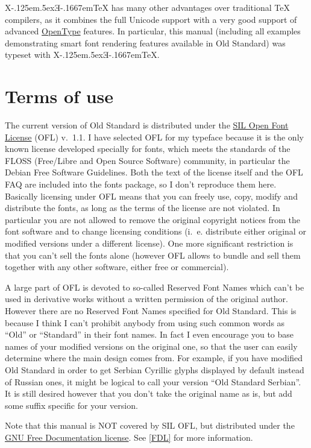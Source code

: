 \documentclass[12pt,a4paper,openany]{book}
\providecommand{\XeTeX}{X\kern-.125em\lower.5ex\hbox{Ǝ}\kern-.1667em\TeX}
\begin{document}
\XeTeX{} has many other advantages over traditional \TeX{} compilers, as it
combines the full Unicode support with a very good support of advanced
\hyperlink{OT}{OpenType} features. In particular, this manual (including
all examples demonstrating smart font rendering features available in Old
Standard) was typeset with \XeTeX.

\section{Terms of use}
\hypertarget{license}{}

The current version of Old Standard is distributed under the
\href{http://scripts.sil.org/OFL}{SIL Open Font License} (OFL) v.~1.1. I have
selected OFL for my typeface because it is the only known license developed
specially for fonts, which meets the standards of the FLOSS (Free/Libre and
Open Source Software) community, in particular the Debian Free Software
Guidelines. Both the text of the license itself and the OFL FAQ are
included into the fonts package, so I don’t reproduce them here. Basically
licensing under OFL means that you can freely use, copy, modify and
distribute the fonts, as long as the terms of the license are not violated.
In particular you are not allowed to remove the original copyright notices
from the font software and to change licensing conditions (i.~e. distribute
either original or modified versions under a different license). One more
significant restriction is that you can’t sell the fonts alone (however
OFL allows to bundle and sell them together with any other software, either
free or commercial).

A large part of OFL is devoted to so-called Reserved Font Names which can't
be used in derivative works without a written permission of the original
author. However there are no Reserved Font Names specified for Old Standard.
This is because I think I can't prohibit anybody from using such common
words as “Old” or “Standard” in their font names. In fact I even encourage
you to base names of your modified versions on the original one, so that 
the user can easily determine where the main design comes from. For example,
if you have modified Old Standard in order to get Serbian Cyrillic glyphs
displayed by default instead of Russian ones, it might be logical to call
your version “Old Standard Serbian”. It is still desired however that you
don't take the original name as is, but add some suffix specific for your
version.

Note that this manual is NOT covered by SIL OFL, but distributed under the
\href{http://gnu.mirror.fr/licenses/fdl.html}{GNU Free Documentation
license}. See \autoref{FDL} for more information.
\end{document}
